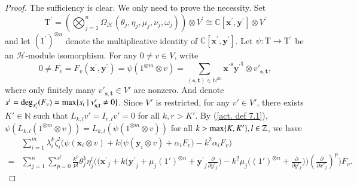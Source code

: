 \documentclass[12pt,reqno]{amsart}
\def\N{\mathbb{N}}
\def\C{\mathbb{C}}
\numberwithin{equation}{section}
\begin{document}
\begin{proof}
The sufficiency is clear. We only need to prove the necessity. 
Set 
\[    \mathrm{T}^\prime=\left(\bigotimes_{j=1}^{n}\Omega_{\mathcal{H}}(\theta_j,\eta_j, \mu_j,\nu_j,\omega_j)\right)\otimes V^\prime\cong\C[\boldsymbol{x}^\prime,\boldsymbol{y}^\prime]\otimes V^\prime
\]
and let $(1^\prime)^{\otimes n}$ denote the multiplicative identity of $\C[\boldsymbol{x^\prime},\boldsymbol{y^\prime}]$. 
Let $\psi:\mathrm{T} \to \mathrm{T}^\prime$ be an $\mathcal{H}$-module isomorphism.
 For any $0\ne v\in V$, write 
 $$0\ne F_{v}=F_v(\boldsymbol{x^\prime},\boldsymbol{y^\prime})=\psi(1^{\otimes m}\otimes v) =\sum_{(\mathbf s,\mathbf t)\in\mathbb N^{2n}} \boldsymbol{x^\prime}^{\mathbf s}\boldsymbol{y^\prime}^{\mathbf t}\otimes v'_{\mathbf s,\mathbf t},$$ 
 where only finitely many $v'_{\mathbf s,\mathbf t}\in V'$ are nonzero. And denote $s^i={\rm deg}_{x'_i}(F_v)={\rm max}\{s_i\mid v'_{\mathbf s,\mathbf t}\ne0\}$. Since $V'$ is restricted, 
for any $v'\in V'$, there exists $K'\in\N$ such that $L_{k,l}v'=I_{r,l}v'=0$ for all $k,r>K'$.
By (\ref{act. def 7.1}), $\psi(L_{k,l}(1^{\otimes m}\otimes v))=L_{k,l}(\psi(1^{\otimes m}\otimes v))$  for all $ k>{\rm max}\{ K,K'\},l\in\mathbb Z$,
we have 
\begin{equation}\label{formula 5.24}
\begin{aligned}
&\sum_{i=1}^m\lambda_i^k\zeta_i^l\Big(\psi(\boldsymbol{x}_i\otimes v)
+k\Big(\psi(\boldsymbol{y}_i\otimes v)+\alpha_iF_v  \Big)-k^2\alpha_iF_v     
  \Big)
\\
=&\sum_{j=1}^n\sum_{p= 0}^{s^j}\frac{k^p}{p!}\theta_j^k\eta_j^l\Bigg(\Bigg(\boldsymbol{x^\prime}_j+k\Bigg(\boldsymbol{y^\prime}_j+\mu_j(1')^{\otimes n}+\boldsymbol{y^\prime}_j\frac{\partial}{\partial{y'_j}}  \Bigg)-k^2\mu_j\Bigg((1')^{\otimes n} 
  +\frac{\partial}{\partial{y'_j}}\Bigg)\Bigg)\left(\frac{\partial}{\partial{x'_j}}     \right)^{p}
\Bigg) F_v.
\end{aligned}

\end{equation}
\end{proof}
\end{document}
